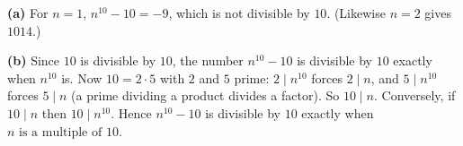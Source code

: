 \textbf{(a)} For $n=1$, $n^{10}-10=-9$, which is not divisible by $10$. (Likewise $n=2$ gives $1014$.)

\textbf{(b)} Since $10$ is divisible by $10$, the number $n^{10}-10$ is divisible by $10$ exactly when $n^{10}$ is. Now $10=2\cdot5$ with $2$ and $5$ prime: $2\mid n^{10}$ forces $2\mid n$, and $5\mid n^{10}$ forces $5\mid n$ (a prime dividing a product divides a factor). So $10\mid n$. Conversely, if $10\mid n$ then $10\mid n^{10}$. Hence $n^{10}-10$ is divisible by $10$ exactly when $\boxed{n\text{ is a multiple of }10}$.
